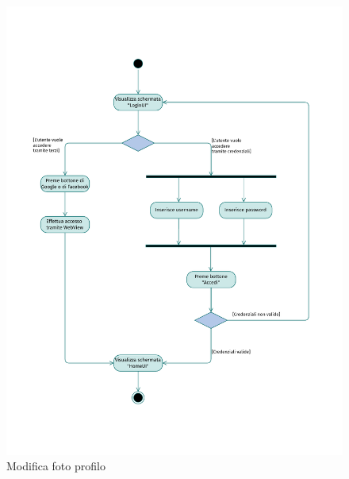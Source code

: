 \documentclass{natourDoc}
\begin{document}
\newpage
\begin{figure}[!htbp]
	\centering
	\includegraphics[width=\textwidth, page=5]{./diagrams/activity.pdf}
	\caption{Modifica foto profilo}
\end{figure}
\FloatBarrier

\newpage
\end{document}
